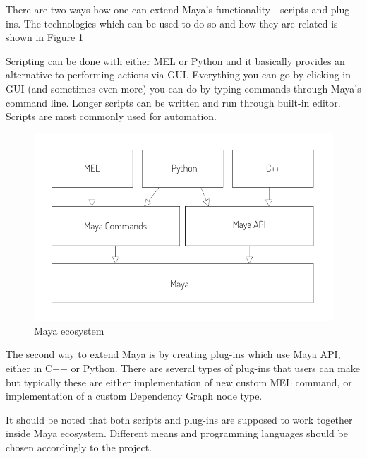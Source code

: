 \documentclass[
  digital, %
  table,   %
  nolof,     %
  nolot,     %
]{fithesis3}
\begin{document}
There are two ways how one can extend Maya's functionality—scripts and plug-ins. The technologies which can be used to do so and how they are related is shown in Figure \ref{fig:maya-ecosystem}

Scripting can be done with either MEL or Python and it basically provides an alternative to performing actions via GUI. Everything you can go by clicking in GUI (and sometimes even more) you can do by typing commands through Maya's command line. Longer scripts can be written and run through built-in editor. Scripts are most commonly used for automation.

\begin{figure}
  \centering
  \includegraphics[scale=0.8]{images/maya-ecosystem.pdf}
  \caption{Maya ecosystem}
  \label{fig:maya-ecosystem}
\end{figure}

The second way to extend Maya is by creating plug-ins which use Maya API, either in C++ or Python. There are several types of plug-ins that users can make but typically these are either implementation of new custom MEL command, or implementation of a custom Dependency Graph node type.

It should be noted that both scripts and plug-ins are supposed to work together inside Maya ecosystem. Different means and programming languages should be chosen accordingly to the project. 

\end{document}
